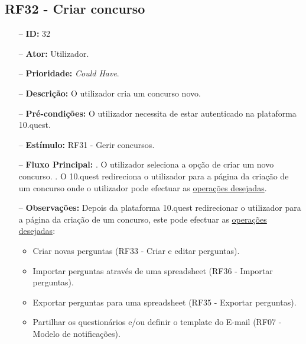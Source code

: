 \subsection{RF32 - Criar concurso}
\begin{itemize}
	\item[--] \textbf{ID:} 32
	\item[--]  \textbf{Ator:} Utilizador.
	\item[--]  \textbf{Prioridade:} \textit{Could Have}.
	\item[--]  \textbf{Descrição:} O utilizador cria um concurso novo.
	\item[--]  \textbf{Pré-condições:} O utilizador necessita de estar autenticado na plataforma 10.quest.
	\item[--]  \textbf{Estímulo:} RF31 - Gerir concursos.
	\item[--]  \textbf{Fluxo Principal:} 
	. O utilizador seleciona a opção de criar um novo concurso.
	. O 10.quest redireciona o utilizador para a página da criação de um concurso onde o utilizador pode efectuar as \underline{operações desejadas}.
	\item[--]  \textbf{Observações:} Depois da plataforma 10.quest redirecionar o utilizador para a página da criação de um concurso, este pode efectuar as \underline{operações desejadas}:
	\begin{itemize}
		\item Criar novas perguntas (RF33 - Criar e editar perguntas).
		\item Importar perguntas através de uma spreadsheet (RF36 - Importar perguntas).
		\item Exportar perguntas para uma spreadsheet (RF35 - Exportar perguntas).
		\item Partilhar os questionários e/ou definir o template do E-mail (RF07 - Modelo de notificações).
	\end{itemize}
\end{itemize}
\newpage

